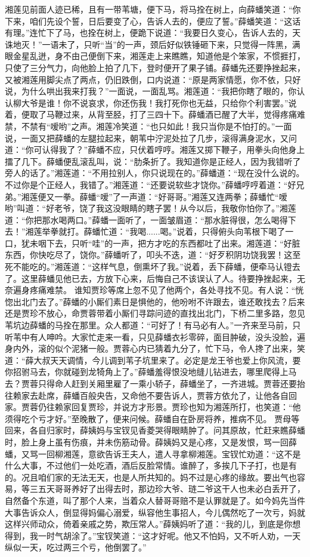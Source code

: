 \documentclass[12pt,oneside]{book}
\begin{document}
湘莲见前面人迹已稀，且有一带苇塘，便下马，将马拴在树上，向薛蟠笑道：“你下来，咱们先设个誓，日后要变了心，告诉人去的，便应了誓。”薛蟠笑道：“这话有理。”连忙下了马，也拴在树上，便跪下说道：“我要日久变心，告诉人去的，天诛地灭！”一语未了，只听“当”的一声，颈后好似铁锤砸下来，只觉得一阵黑，满眼金星乱迸，身不由己便倒下来，湘莲走上来瞧瞧，知道他是个笨家，不惯捱打，只使了三分气力，向他脸上拍了几下，登时便开了果子铺。薛蟠先还要挣挫起来，又被湘莲用脚尖点了两点，仍旧跌倒，口内说道：“原是两家情愿，你不依，只好说，为什么哄出我来打我？”一面说，一面乱骂。湘莲道：“我把你瞎了眼的，你认认柳大爷是谁！你不说哀求，你还伤我！我打死你也无益，只给你个利害罢。”说着，便取了马鞭过来，从背至胫，打了三四十下。薛蟠酒已醒了大半，觉得疼痛难禁，不禁有“嗳哟”之声。湘莲冷笑道：“也只如此！我只当你是不怕打的。”一面说，一面又把薛蟠的左腿拉起来，朝苇中泞泥处拉了几步，滚得满身泥水，又问道：“你可认得我了？”薛蟠不应，只伏着哼哼。湘莲又掷下鞭子，用拳头向他身上擂了几下。薛蟠便乱滚乱叫，说：“肋条折了。我知道你是正经人，因为我错听了旁人的话了。”湘莲道：“不用拉别人，你只说现在的。”薛蟠道：“现在没什么说的。不过你是个正经人，我错了。”湘莲道：“还要说软些才饶你。”薛蟠哼哼着道：“好兄弟。”湘莲便又一拳。薛蟠“嗳”了一声道：“好哥哥。”湘莲又连两拳；薛蟠忙“嗳哟”叫道：“好老爷，饶了我这没眼睛的瞎子罢！从今以后，我敬你怕你了。”湘莲道：“你把那水喝两口。”薛蟠一面听了，一面皱眉道：“那水脏得很，怎么喝得下去！”湘莲举拳就打。薛蟠忙道：“我喝......喝。”说着，只得俯头向苇根下喝了一口，犹未咽下去，只听“哇”的一声，把方才吃的东西都吐了出来。湘莲道：“好脏东西，你快吃尽了，饶你。”薛蟠听了，叩头不迭，道：“好歹积阴功饶我罢！这至死不能吃的。”湘莲道：“这样气息，倒熏坏了我。”说着，丢下薛蟠，便牵马认镫去了。这里薛蟠见他已去，方放下心来，后悔自己不该误认了人。待要挣挫起来，无奈遍身疼痛难禁。
谁知贾珍等席上忽不见了他两个，各处寻找不见。有人说：“恍惚出北门去了。”薛蟠的小厮们素日是惧他的，他吩咐不许跟去，谁还敢找去？后来还是贾珍不放心，命贾蓉带着小厮们寻踪问迹的直找出北门，下桥二里多路，忽见苇坑边薛蟠的马拴在那里。众人都道：“可好了！有马必有人。”一齐来至马前，只听苇中有人呻吟。大家忙走来一看，只见薛蟠衣衫零碎，面目肿破，没头没脸，遍身内外，滚的似个泥猪一般。贾蓉心内已猜着九分了，忙下马，令人搀了出来，笑道：“薛大叔天天调情，今儿调到苇子坑里来了。必定是龙王爷也爱上你风流，要你招驸马去，你就碰到龙犄角上了。”薛蟠羞得恨没地缝儿钻进去，哪里爬得上马去？贾蓉只得命人赶到关厢里雇了一乘小轿子，薛蟠坐了，一齐进城。贾蓉还要抬往赖家去赴席，薛蟠百般央告，又命他不要告诉人，贾蓉方依允了，让他各自回家。贾蓉仍往赖家回复贾珍，并说方才形景。贾珍也知为湘莲所打，也笑道：“他须得吃个亏才好。”至晚散了，便来问候。薛蟠自在卧房将养，推病不见。
贾母等回来，各自归家时，薛姨妈与宝钗见香菱哭得眼睛肿了。问其原故，忙赶来瞧薛蟠时，脸上身上虽有伤痕，并未伤筋动骨。薛姨妈又是心疼，又是发恨，骂一回薛蟠，又骂一回柳湘莲，意欲告诉王夫人，遣人寻拿柳湘莲。宝钗忙劝道：“这不是什么大事，不过他们一处吃酒，酒后反脸常情。谁醉了，多挨几下子打，也是有的。况且咱们家的无法无天，也是人所共知的。妈不过是心疼的缘故。要出气也容易，等三五天哥哥养好了出得去时，那边珍大爷、琏二爷这干人也未必白丢开了，自然备个东道，叫了那个人来，当着众人替哥哥赔不是认罪就是了。如今妈先当件大事告诉众人，倒显得妈偏心溺爱，纵容他生事招人，今儿偶然吃了一次亏，妈就这样兴师动众，倚着亲戚之势，欺压常人。”薛姨妈听了道：“我的儿，到底是你想得到，我一时气胡涂了。”宝钗笑道：“这才好呢。他又不怕妈，又不听人劝，一天纵似一天，吃过两三个亏，他倒罢了。”
\end{document}
